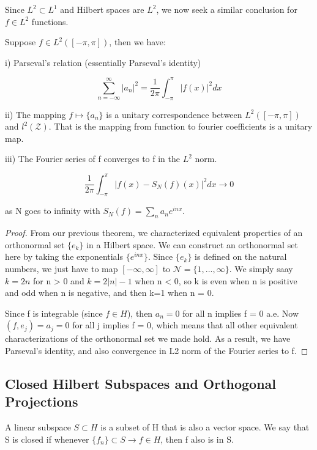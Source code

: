 \documentclass[class=article, crop=false]{standalone}
\begin{document}
		Since $L^2 \subset L^1$ and Hilbert spaces are $L^2$, we now seek a similar conclusion for $f \in L^2$ functions. 

		\begin{theorem} 
			Suppose $f \in L^2([-\pi, \pi])$, then we have:

			i) Parseval's relation (essentially Parseval's identity)

				$$\sum_{n=-\infty}^\infty |a_n|^2 = \frac{1}{2\pi} \int_{-\pi}^\pi |f(x)|^2 dx$$

			ii) The mapping $f \mapsto \{a_n\}$ is a unitary correspondence between $L^2([-\pi, \pi])$ and $l^2(\mathcal{Z})$. That is the mapping from function to fourier coefficients is a unitary map.

			iii) The Fourier series of f converges to f in the $L^2$ norm.

				$$\frac{1}{2\pi} \int_{-\pi}^\pi |f(x) - S_N(f)(x)|^2 dx \rightarrow 0$$

			as N goes to infinity with $S_N(f) = \sum_{n} a_n e^{inx}$.
		\end{theorem}
		\begin{proof}
			From our previous theorem, we characterized equivalent properties of an orthonormal set $\{e_k\}$ in a Hilbert space. We can construct an orthonormal set here by taking the exponentials $\{e^{inx}\}$. Since $\{e_k\}$ is defined on the natural numbers, we just have to map $[-\infty, \infty]$ to $\mathcal{N} = \{1, ..., \infty\}$. We simply saay $k = 2n$ for n > 0 and $k = 2|n| - 1$ when n < 0, so k is even when n is positive and odd when n is negative, and then k=1 when n = 0. 

			Since f is integrable (since $f \in H$), then $a_n = 0$ for all n implies f = 0 a.e. Now $(f, e_j) = a_j = 0$ for all j implies f = 0, which means that all other equivalent characterizations of the orthonormal set we made hold. As a result, we have Parseval's identity, and also convergence in L2 norm of the Fourier series to f.
		\end{proof}

	\subsection{Closed Hilbert Subspaces and Orthogonal Projections}
		A linear subspace $S \subset H$ is a subset of H that is also a vector space. We say that S is closed if whenever $\{f_n\} \subset S \rightarrow f \in H$, then f also is in S.
\end{document}
